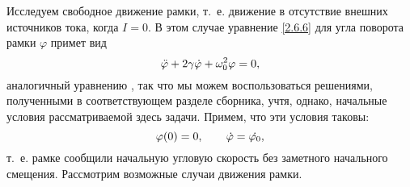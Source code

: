  Исследуем свободное движение рамки,
т.~е. движение в отсутствие внешних источников тока, когда $I = 0$. В этом
случае уравнение \eqref{2.6.6} для угла поворота рамки $\varphi$ примет вид
\begin{equation}
	\eqmark{2.6.9}
	\ddot{\varphi} + 2\gamma \dot{\varphi} + \omega^2_{0}\varphi = 0,
\end{equation}
аналогичный уравнению , так что мы можем воспользоваться решениями,
полученными в соответствующем разделе сборника, учтя, однако, начальные
условия рассматриваемой здесь задачи. Примем, что эти условия таковы:
\begin{equation}
	\eqmark{2.6.10}
	 \varphi(0) = 0, \qquad \dot{\varphi} = \dot{\varphi_0},
\end{equation}
т.~е. рамке сообщили начальную угловую скорость без заметного
начального смещения. Рассмотрим возможные случаи движения рамки.
